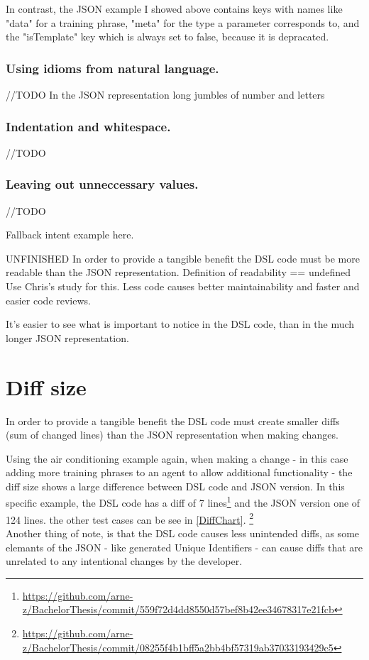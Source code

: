 In contrast, the JSON example I showed above contains keys with names like "data" for a training phrase, "meta" for the type a parameter corresponds to, and the "isTemplate" key which is always set to false, because it is depracated.

\subsubsection{Using idioms from natural language.}
//TODO
In the JSON representation long jumbles of number and letters 

\subsubsection{Indentation and whitespace.}
//TODO

\subsubsection{Leaving out unneccessary values.}
//TODO

Fallback intent example here.

UNFINISHED
In order to provide a tangible benefit the DSL code must be more readable than the JSON representation.
\citeNeeded Definition of readability == undefined
Use Chris's study for this.
Less code causes better maintainability and faster and easier code reviews. 

It's easier to see what is important to notice in the DSL code, than in the much longer JSON representation.


\section{Diff size}
In order to provide a tangible benefit the DSL code must create smaller diffs (sum of changed lines) than the JSON representation when making changes.

Using the air conditioning example again, when making a change - in this case adding more training phrases to an agent to allow additional functionality - the diff size shows a large difference between DSL code and JSON version. In this specific example, the DSL code has a diff of 7 lines\footnote{\url{https://github.com/arne-z/BachelorThesis/commit/559f72d4dd8550d57bef8b42ee34678317e21fcb}} and the JSON version one of 124 lines. the other test cases can be see in \autoref{DiffChart}.
\footnote{\url{https://github.com/arne-z/BachelorThesis/commit/08255f4b1bff5a2bb4bf57319ab37033193429c5}}\\
Another thing of note, is that the DSL code causes less unintended diffs, as some elemants of the JSON - like generated Unique Identifiers - can cause diffs that are unrelated to any intentional changes by the developer.


